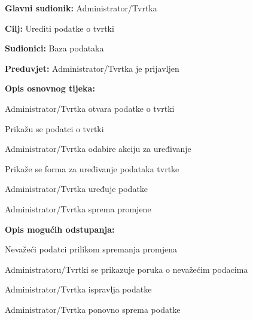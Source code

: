 \noindent {}
\begin{packed_item}
	
	\item \textbf{Glavni sudionik:} Administrator/Tvrtka
	\item  \textbf{Cilj:} Urediti podatke o tvrtki
	\item  \textbf{Sudionici:} Baza podataka
	\item  \textbf{Preduvjet:} Administrator/Tvrtka je prijavljen
	\item  \textbf{Opis osnovnog tijeka:}
	
	\item[] \begin{packed_enum}
		
		\item Administrator/Tvrtka otvara podatke o tvrtki
		\item Prikažu se podatci o tvrtki
		\item Administrator/Tvrtka odabire akciju za uređivanje
		\item Prikaže se forma za uređivanje podataka tvrtke
		\item Administrator/Tvrtka uređuje podatke
		\item Administrator/Tvrtka sprema promjene
	
	\end{packed_enum}
	
	\item  \textbf{Opis mogućih odstupanja:}
	
	\item[] \begin{packed_item}
		
		\item[6.a] Nevažeći podatci prilikom spremanja promjena
		\item[] \begin{packed_enum}
			
			\item Administratoru/Tvrtki se prikazuje poruka o nevažećim podacima
			\item Administrator/Tvrtka ispravlja podatke
			\item Administrator/Tvrtka ponovno sprema podatke
			
		\end{packed_enum}
		
	\end{packed_item}
\end{packed_item}

